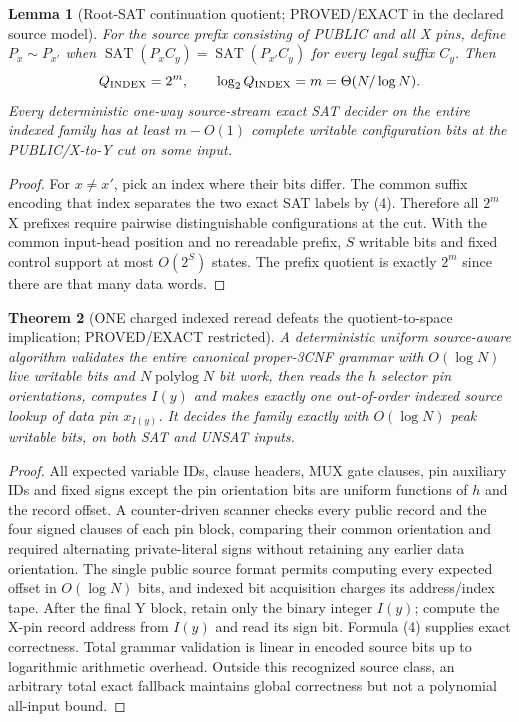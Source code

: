 \documentclass[11pt]{article}
\newtheorem{theorem}{Theorem}
\newtheorem{lemma}[theorem]{Lemma}
\newcommand{\SAT}{\operatorname{SAT}}
\begin{document}
\begin{lemma}[Root-SAT continuation quotient; PROVED/EXACT in the declared source model]
For the source prefix consisting of PUBLIC and all X pins, define $P_x\sim P_{x'}$ when $\SAT(P_xC_y)=\SAT(P_{x'}C_y)$ for every legal suffix $C_y$. Then
\[
Q_{\rm INDEX}=2^m,\qquad \log_2 Q_{\rm INDEX}=m=\Theta(N/\log N).
\]
Every deterministic one-way source-stream exact SAT decider on the entire indexed family has at least $m-O(1)$ complete writable configuration bits at the PUBLIC/X-to-Y cut on some input.
\end{lemma}
\begin{proof}
For $x\ne x'$, pick an index where their bits differ. The common suffix encoding that index separates the two exact SAT labels by (4). Therefore all $2^m$ X prefixes require pairwise distinguishable configurations at the cut. With the common input-head position and no rereadable prefix, $S$ writable bits and fixed control support at most $O(2^S)$ states. The prefix quotient is exactly $2^m$ since there are that many data words.
\end{proof}

\begin{theorem}[ONE charged indexed reread defeats the quotient-to-space implication; PROVED/EXACT restricted]
A deterministic uniform \emph{source-aware} algorithm validates the entire canonical proper-3CNF grammar with $O(\log N)$ live writable bits and $N\operatorname{polylog}N$ bit work, then reads the $h$ selector pin orientations, computes $I(y)$ and makes exactly \emph{one} out-of-order indexed source lookup of data pin $x_{I(y)}$. It decides the family exactly with $O(\log N)$ peak writable bits, on both SAT and UNSAT inputs.
\end{theorem}
\begin{proof}
All expected variable IDs, clause headers, MUX gate clauses, pin auxiliary IDs and fixed signs except the pin orientation bits are uniform functions of $h$ and the record offset. A counter-driven scanner checks every public record and the four signed clauses of each pin block, comparing their common orientation and required alternating private-literal signs without retaining any earlier data orientation. The single public source format permits computing every expected offset in $O(\log N)$ bits, and indexed bit acquisition charges its address/index tape. After the final Y block, retain only the binary integer $I(y)$; compute the X-pin record address from $I(y)$ and read its sign bit. Formula (4) supplies exact correctness. Total grammar validation is linear in encoded source bits up to logarithmic arithmetic overhead. Outside this recognized source class, an arbitrary total exact fallback maintains global correctness but not a polynomial all-input bound.
\end{proof}
\end{document}
